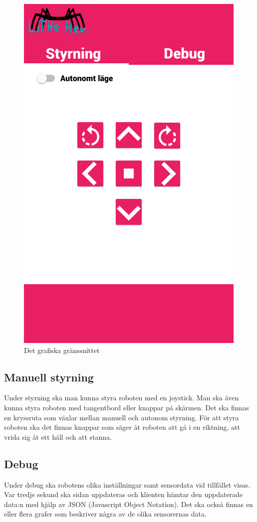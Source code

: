 \documentclass[a4paper,titlepage,12pt]{article}
\begin{document}
	\begin{figure}[h]
		\centering
		\includegraphics[width=0.5\linewidth]{images/gui-index.png}
		\caption{Det grafiska gränssnittet\label{fig:gui-overview}}
	\end{figure}
    
    \subsection{Manuell styrning}
    Under styrning ska man kunna styra roboten med en joystick. Man ska även
    kunna styra roboten med tangentbord eller knappar på skärmen. Det ska finnas
    en kryssruta som växlar mellan manuell och autonom styrning. För att styra
    roboten ska det finnas knappar som säger åt roboten att gå i en riktning,
    att vrida sig åt ett håll och att stanna.

    \subsection{Debug}
	Under debug ska robotens olika inställningar samt sensordata vid tillfället
    visas. Var tredje sekund ska sidan uppdateras och klienten hämtar den
    uppdaterade data:n med hjälp av JSON (Javascript Object Notation). Det ska
    också finnas en eller flera grafer som beskriver några av de olika
    sensorernas data.

\end{document}
